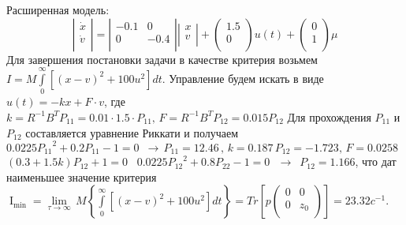 \documentclass[preprint,russian,a5paper,10pt,twoside,mediummath]{ncc}
\begin{document}
Расширенная модель: \[\left| \begin{matrix}
   {\dot{x}}  \\
   {\dot{v}}  \\
\end{matrix} \right|=\left| \begin{matrix}
   -0.1 & 0  \\
   0 & -0.4  \\
\end{matrix} \right|\left| \begin{matrix}
   x  \\
   v  \\
\end{matrix} \right|+\left( \begin{matrix}
   1.5  \\
   0  \\
\end{matrix} \right)u(t)+\left( \begin{matrix}
   0  \\
   1  \\
\end{matrix} \right)\mu \]
Для завершения постановки задачи в качестве критерия возьмем $I=M\int\limits_{0}^{\infty }{\left[ {{(x-v)}^{2}}+100{{u}^{2}} \right]}dt$. Управление будем искать в виде $u(t)=-kx+F\cdot v$, где $k={{R}^{-1}}{{B}^{T}}{{P}_{11}}=0.01\cdot 1.5\cdot {{P}_{11}},\,F={{R}^{-1}}{{B}^{T}}{{P}_{12}}=0.015{{P}_{12}}$ 
Для прохождения ${{P}_{11}}$  и ${{P}_{12}}$  составляется уравнение Риккати и получаем $0.0225{{P}_{11}}^{2}+0.2{{P}_{11}}-1=0\,\,\,\to \,{{P}_{11}}=12.46\,,\,k=0.187\,{{P}_{12}}=-1.723,\,F=0.0258$ 
$(0.3+1.5k){{P}_{12}}+1=0\,\,\,$ 
$0.0225{{P}_{12}}^{2}+0.8{{P}_{22}}-1=0\,\,\,\,\to \,\,\,{{P}_{12}}=1.166$, что дат наименьшее значение критерия ${{\operatorname{I}}_{\min }}=\underset{\tau \to \infty }{\mathop{\lim }}\,M\left\{ \int\limits_{0}^{\infty }{\left[ {{(x-v)}^{2}}+100{{u}^{2}} \right]}dt \right\}=Tr\left[ p\left( \begin{matrix}
   0 & 0  \\
   0 & {{z}_{0}}  \\
\end{matrix} \right) \right]=23.32{{c}^{-1}}.$
\end{document}
